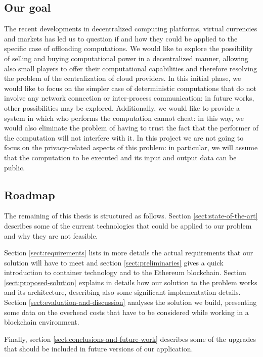 \subsection{Our goal}
The recent developments in decentralized computing platforms, virtual currencies and markets has led us to question if and how they could be applied to the specific case of offloading computations.
We would like to explore the possibility of selling and buying computational power in a decentralized manner, allowing also small players to offer their computational capabilities and therefore resolving the problem of the centralization of cloud providers. In this initial phase, we would like to focus on the simpler case of deterministic computations that do not involve any network connection or inter-process communication: in future works, other possibilities may be explored.
Additionally, we would like to provide a system in which who performs the computation cannot cheat: in this way, we would also eliminate the problem of having to trust the fact that the performer of the computation will not interfere with it.
In this project we are not going to focus on the privacy-related aspects of this problem: in particular, we will assume that the computation to be executed and its input and output data can be public.

\subsection{Roadmap}
The remaining of this thesis is structured as follows. Section \ref{sect:state-of-the-art} describes some of the current technologies that could be applied to our problem and why they are not feasible. 

Section \ref{sect:requirements} lists in more details the actual requirements that our solution will have to meet and section \ref{sect:preliminaries} gives a quick introduction to container technology and to the Ethereum blockchain. Section \ref{sect:proposed-solution} explains in details how our solution to the problem works and its architecture, describing also some significant implementation details. Section \ref{sect:evaluation-and-discussion} analyses the solution we build, presenting some data on the overhead costs that have to be considered while working in a blockchain environment.

Finally, section \ref{sect:conclusions-and-future-work} describes some of the upgrades that should be included in future versions of our application.
